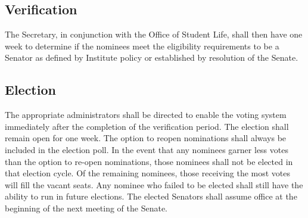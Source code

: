 \documentclass[12pt]{scrreprt}
\begin{document}
\subsection{Verification} \label{sec:election_verification}
The Secretary, in conjunction with the Office of Student Life, shall then have 
one week to determine if the nominees meet the eligibility requirements to be 
a Senator as defined by Institute policy or established by resolution of the 
Senate. 

\subsection{Election}
The appropriate administrators shall be directed to enable the voting system 
immediately after the completion of the verification period. The election 
shall remain open for one week. The option to reopen nominations shall always be included in the election poll. In the event that any nominees garner less votes than the option to re-open nominations, those nominees shall not be elected in that election cycle. Of the remaining nominees, those receiving the most votes will fill the vacant seats. Any nominee who failed to be elected shall still have the ability to run in future elections. The elected Senators shall assume office at the beginning of the next meeting of the Senate.
\end{document}

